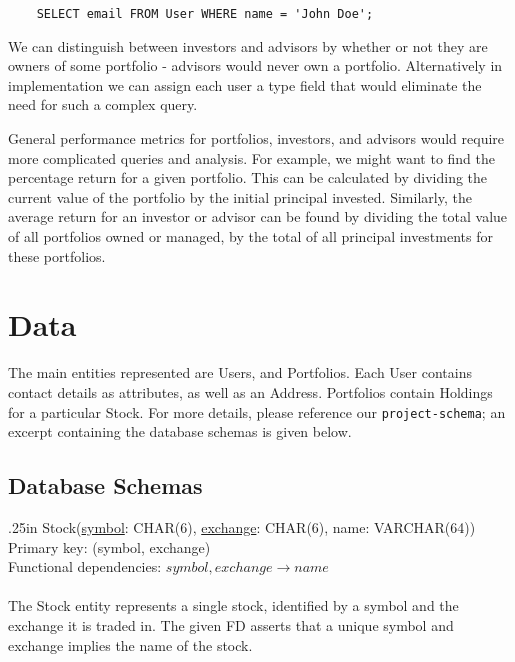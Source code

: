 \documentclass[letterpaper]{report}
\begin{document}
\verb|    SELECT email FROM User WHERE name = 'John Doe';|

We can distinguish between investors and advisors by whether or not they are owners of some portfolio - advisors would never own a portfolio. Alternatively in implementation we can assign each user a type field that would eliminate the need for such a complex query.

General performance metrics for portfolios, investors, and advisors would require more complicated queries and analysis. For example, we might want to find the percentage return for a given portfolio. This can be calculated by dividing the current value of the portfolio by the initial principal invested. Similarly, the average return for an investor or advisor can be found by dividing the total value of all portfolios owned or managed, by the total of all principal investments for these portfolios.

\section*{Data}

The main entities represented are {\sf User}s, and {\sf Portfolio}s. Each {\sf User} contains contact details as attributes, as well as an {\sf Address}. {\sf Portfolio}s contain {\sf Holding}s for a particular {\sf Stock}. For more details, please reference our {\tt project-schema}; an excerpt containing the database schemas is given below.

\subsection*{Database Schemas}

\hangindent .25in
{\sffamily Stock(\underline{symbol}: CHAR(6), \underline{exchange}: CHAR(6), name: VARCHAR(64))} \\
Primary key: {\sffamily (symbol, exchange)} \\
Functional dependencies: $symbol, exchange \to name$ \\\\
The {\sffamily Stock} entity represents a single stock, identified by a symbol and the exchange it is traded in. The given FD asserts that a unique symbol and exchange implies the name of the stock.
\end{document}
